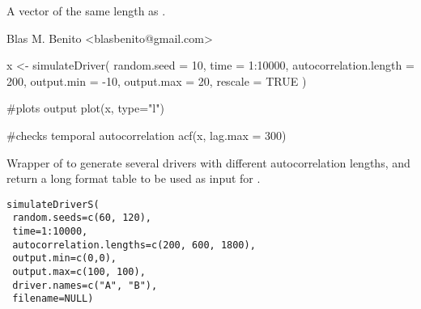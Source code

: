 \documentclass[letterpaper]{book}
\begin{document}
%
\begin{Value}
A vector of the same length as .
\end{Value}
%
\begin{Author}\relax
Blas M. Benito  <blasbenito@gmail.com>
\end{Author}
%
\begin{SeeAlso}\relax
{}
\end{SeeAlso}
%
\begin{Examples}
\begin{ExampleCode}

x <- simulateDriver(
  random.seed = 10,
  time = 1:10000,
  autocorrelation.length = 200,
  output.min = -10,
  output.max = 20,
  rescale = TRUE
  )

#plots output
plot(x, type="l")

#checks temporal autocorrelation
acf(x, lag.max = 300)

\end{ExampleCode}
\end{Examples}
%
\begin{Description}\relax
Wrapper of  to generate several drivers with different autocorrelation lengths, and return a long format table to be used as input for .
\end{Description}
%
\begin{Usage}
\begin{verbatim}
simulateDriverS(
 random.seeds=c(60, 120),
 time=1:10000,
 autocorrelation.lengths=c(200, 600, 1800),
 output.min=c(0,0),
 output.max=c(100, 100),
 driver.names=c("A", "B"),
 filename=NULL)
\end{verbatim}
\end{Usage}
%
\end{document}
